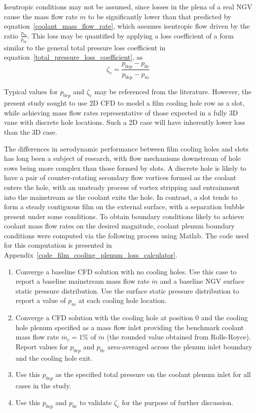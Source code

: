 \documentclass[a4paper, 11pt, oneside]{report}
\begin{document}
Isentropic conditions may not be assumed, since losses in the plena of a real NGV cause the mass flow rate $\dot{m}$ to be significantly lower than that predicted by equation~\ref{coolant_mass_flow_rate}, which assumes isentropic flow driven by the ratio $\frac{p_m}{p_{0c}}$. This loss may be quantified by applying a loss coefficient of a form similar to the general total pressure loss coefficient in equation~\ref{total_pressure_loss_coefficient}, as
\begin{equation}\label{film_coolant_loss_coefficient}
\zeta_c = 
\frac{
p_{0cp} - p_{0c}
}{
p_{0cp} - p_m
}
\end{equation}

Typical values for $p_{0cp}$ and $\zeta_c$ may be referenced from the literature. However, the present study sought to use 2D CFD to model a film cooling hole row as a slot, while achieving mass flow rates representative of those expected in a fully 3D vane with discrete hole locations. Such a 2D case will have inherently lower loss than the 3D case. 

The differences in aerodynamic performance between film cooling holes and slots has long been a subject of research, with flow mechanisms downstream of hole rows being more complex than those formed by slots. A discrete hole is likely to have a pair of counter-rotating secondary flow vortices formed as the coolant enters the hole, with an unsteady process of vortex stripping and entrainment into the mainstream as the coolant exits the hole. In contrast, a slot tends to form a steady contiguous film on the external surface, with a separation bubble present under some conditions. To obtain boundary conditions likely to achieve coolant mass flow rates on the desired magnitude, coolant plenum boundary conditions were computed via the following process using Matlab. The code used for this computation is presented in Appendix~\ref{code_film_cooling_plenum_loss_calculator}.
\begin{enumerate}
  \item Converge a baseline CFD solution with no cooling holes. Use this case to report a baseline mainstream mass flow rate $\dot{m}$ and a baseline NGV surface static pressure distribution. Use the surface static pressure distribution to report a value of $p_m$ at each cooling hole location.
  \item Converge a CFD solution with the cooling hole at position $0$ and the cooling hole plenum specified as a mass flow inlet providing the benchmark coolant mass flow rate $\dot{m_c} = 1\%$ of $\dot{m}$ (the rounded value obtained from Rolls-Royce). Report values for $p_{0cp}$ and $p_{0c}$ area-averaged across the plenum inlet boundary and the cooling hole exit.
  \item Use  this $p_{0cp}$ as the specified total pressure on the coolant plenum inlet for all cases in the study.
  \item Use this $p_{0cp}$ and $p_{0c}$ to validate $\zeta_c$ for the purpose of further discussion.
\end{enumerate}
\end{document}
